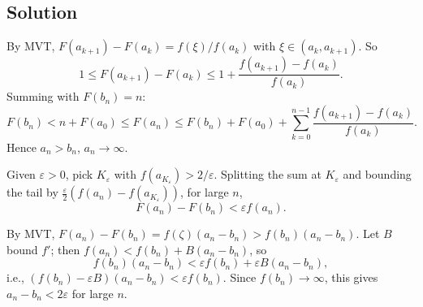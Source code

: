 \documentclass{article}
\begin{document}
\subsection*{Solution}
By MVT, $F(a_{k+1})-F(a_k) = f(\xi)/f(a_k)$ with $\xi\in(a_k,a_{k+1})$. So
\[1\le F(a_{k+1})-F(a_k)\le 1 + \frac{f(a_{k+1})-f(a_k)}{f(a_k)}.\]
Summing with $F(b_n)=n$:
\[F(b_n) < n + F(a_0) \le F(a_n) \le F(b_n) + F(a_0) + \sum_{k=0}^{n-1}\frac{f(a_{k+1})-f(a_k)}{f(a_k)}.\tag{4}\]
Hence $a_n>b_n$, $a_n\to\infty$.

Given $\varepsilon>0$, pick $K_\varepsilon$ with $f(a_{K_\varepsilon})>2/\varepsilon$. Splitting the sum at $K_\varepsilon$ and bounding the tail by $\frac{\varepsilon}{2}(f(a_n)-f(a_{K_\varepsilon}))$, for large $n$,
\[F(a_n) - F(b_n) < \varepsilon f(a_n).\]

By MVT, $F(a_n)-F(b_n) = f(\zeta)(a_n-b_n) > f(b_n)(a_n-b_n)$. Let $B$ bound $f'$; then $f(a_n) < f(b_n) + B(a_n-b_n)$, so
\[f(b_n)(a_n-b_n) < \varepsilon f(b_n) + \varepsilon B(a_n-b_n),\]
i.e., $(f(b_n)-\varepsilon B)(a_n-b_n) < \varepsilon f(b_n)$. Since $f(b_n)\to\infty$, this gives $a_n-b_n<2\varepsilon$ for large $n$.
\end{document}
